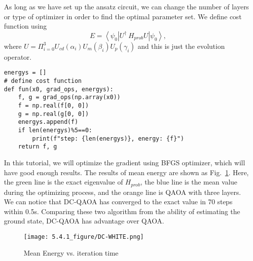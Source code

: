 As long as we have set up the ansatz circuit, we can change the number of layers or type of optimizer in order to find the optimal parameter set. We define cost function using
\begin{equation}
    E = \left<\psi_0\right|U^{\dagger}\ H_{prob} U\left|\psi_0\right>,
\end{equation}
where $U = \Pi_{i=0}^3 U_{cd}(\alpha_i)U_m(\beta_i)U_p(\gamma_i)$ and this is just the evolution operator.
\begin{lstlisting}
energys = []
# define cost function
def fun(x0, grad_ops, energys):
    f, g = grad_ops(np.array(x0))
    f = np.real(f[0, 0])
    g = np.real(g[0, 0])
    energys.append(f)
    if len(energys)%5==0:
        print(f"step: {len(energys)}, energy: {f}")
    return f, g
\end{lstlisting}

In this tutorial, we will optimize the gradient using BFGS optimizer\cite{chandarana2022meta}, which will have good enough results. The results of mean energy are shown as Fig.~\ref{fig:dc}. Here, the green line is the exact eigenvalue of $H_{prob}$, the blue line is the mean value during the optimizing process, and the orange line is QAOA with three layers. We can notice that DC-QAOA has converged to the exact value in 70 steps within 0.5s. Comparing these two algorithm from the ability of estimating the ground state, DC-QAOA has advantage over QAOA.
\begin{figure}
    \centering
    \texttt{[image: 5.4.1\_figure/DC-WHITE.png]}
    \caption{Mean Energy vs. iteration time}
    \label{fig:dc}
\end{figure}
